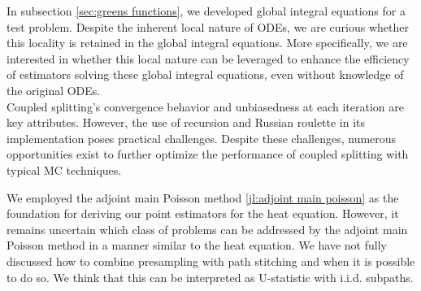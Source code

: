 \documentclass[a4paper,12pt]{article}
\begin{document}
In subsection \ref{sec:greens functions}, we developed global integral equations for a test problem.
Despite the inherent local nature of ODEs, we are curious whether this locality is retained in the global integral equations.
More specifically, we are interested in whether this local nature can be leveraged to enhance the efficiency of
estimators solving these global integral equations, even without knowledge of the original ODEs.  \\

Coupled splitting's convergence behavior and unbiasedness at each iteration are key attributes.
However, the use of recursion and Russian roulette in its implementation poses practical challenges.
Despite these challenges, numerous opportunities exist to further optimize the performance of coupled splitting
with typical MC techniques.

We employed the adjoint main Poisson method \ref{jl:adjoint main poisson} as the foundation for deriving our
point estimators for the heat equation. However, it remains uncertain which class of problems can be addressed
by the adjoint main Poisson method in a manner similar to the heat equation.
We have not fully discussed how to combine presampling with path stitching and when it is possible to do so.
We think that this can be interpreted as U-statistic with i.i.d. subpaths. \\




\end{document}

